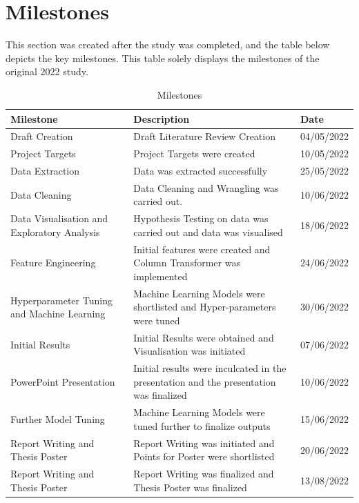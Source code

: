 \section{Milestones}
This section was created after the study was completed, and the table below depicts the key milestones. This table solely displays the milestones of the original 2022 study.
\begin{center}
\begin{table}[!ht]
\begin{tabular}{ |p{3.5cm}| p{8cm}|  p{2cm}|}
\hline
\textbf{Milestone} & \textbf{Description} & \textbf{Date}\\
\hline
Draft Creation & Draft Literature Review Creation & 04/05/2022\\
\hline
Project Targets & Project Targets were created & 10/05/2022 \\
\hline
Data Extraction & Data was extracted successfully & 25/05/2022\\
\hline
Data Cleaning & Data Cleaning and Wrangling was carried out. & 10/06/2022\\
\hline
Data Visualisation and Exploratory Analysis & Hypothesis Testing on data was carried out and data was visualised & 18/06/2022\\
\hline
Feature Engineering & Initial features were created and Column Transformer was implemented & 24/06/2022\\
\hline
Hyperparameter Tuning and Machine Learning & Machine Learning Models were shortlisted and Hyper-parameters were tuned & 30/06/2022\\
\hline
Initial Results & Initial Results were obtained and Visualisation was initiated & 07/06/2022\\
\hline
PowerPoint Presentation & Initial results were inculcated in the presentation and the presentation was finalized & 10/06/2022\\
\hline
Further Model Tuning & Machine Learning Models were tuned further to finalize outputs & 15/06/2022\\
\hline
Report Writing and Thesis Poster & Report Writing was initiated and Points for Poster were shortlisted & 20/06/2022\\
\hline 
Report Writing and Thesis Poster & Report Writing was finalized and Thesis Poster was finalized & 13/08/2022\\
\hline
\end{tabular}
\caption{Milestones}
\label{Milestones}
\end{table}
\end{center}


